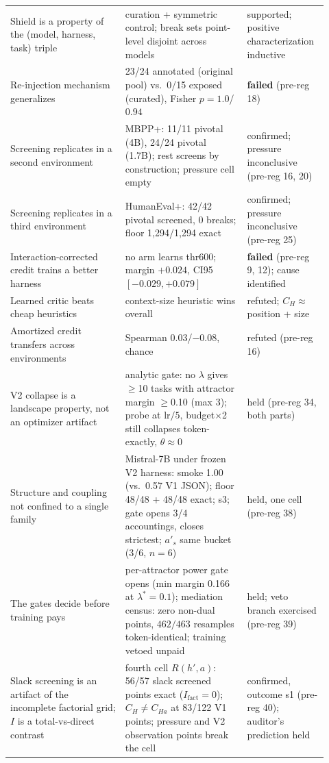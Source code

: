 \documentclass{article}
\theoremstyle{remark}
\begin{document}
\begin{table}[h]
\begin{tabular}{p{0.34\linewidth}p{0.36\linewidth}p{0.22\linewidth}}
Shield is a property of the (model, harness, task) triple & curation + symmetric control; break sets point-level disjoint across models & supported; positive characterization inductive \\
Re-injection mechanism generalizes & 23/24 annotated (original pool) vs.\ 0/15 exposed (curated), Fisher $p=1.0$/$0.94$ & \textbf{failed} (pre-reg 18) \\
Screening replicates in a second environment & MBPP+: 11/11 pivotal (4B), 24/24 pivotal (1.7B); rest screens by construction; pressure cell empty & confirmed; pressure inconclusive (pre-reg 16, 20) \\
Screening replicates in a third environment & HumanEval+: 42/42 pivotal screened, 0 breaks; floor 1{,}294/1{,}294 exact & confirmed; pressure inconclusive (pre-reg 25) \\
Interaction-corrected credit trains a better harness & no arm learns thr600; margin $+0.024$, CI95 $[-0.029,+0.079]$ & \textbf{failed} (pre-reg 9, 12); cause identified \\
Learned critic beats cheap heuristics & context-size heuristic wins overall & refuted; $C_H\approx$ position + size \\
Amortized credit transfers across environments & Spearman $0.03$/$-0.08$, chance & refuted (pre-reg 16) \\
V2 collapse is a landscape property, not an optimizer artifact & analytic gate: no $\lambda$ gives $\geq$10 tasks with attractor margin $\geq$0.10 (max 3); probe at lr$/5$, budget$\times$2 still collapses token-exactly, $\theta\approx 0$ & held (pre-reg 34, both parts) \\
Structure and coupling not confined to a single family & Mistral-7B under frozen V2 harness: smoke 1.00 (vs.\ 0.57 V1 JSON); floor 48/48 + 48/48 exact; s3; gate opens 3/4 accountings, closes strictest; $a'_s$ same bucket (3/6, $n{=}6$) & held, one cell (pre-reg 38) \\
The gates decide before training pays & per-attractor power gate opens (min margin 0.166 at $\lambda^{*}{=}0.1$); mediation census: zero non-dual points, $462/463$ resamples token-identical; training vetoed unpaid & held; veto branch exercised (pre-reg 39) \\
Slack screening is an artifact of the incomplete factorial grid; $I$ is a total-vs-direct contrast & fourth cell $R(h',a)$: 56/57 slack screened points exact ($I_{\text{fact}}=0$); $C_H \neq C_{Ha}$ at 83/122 V1 points; pressure and V2 observation points break the cell & confirmed, outcome s1 (pre-reg 40); auditor's prediction held \\

\end{tabular}
\end{table}
\end{document}
